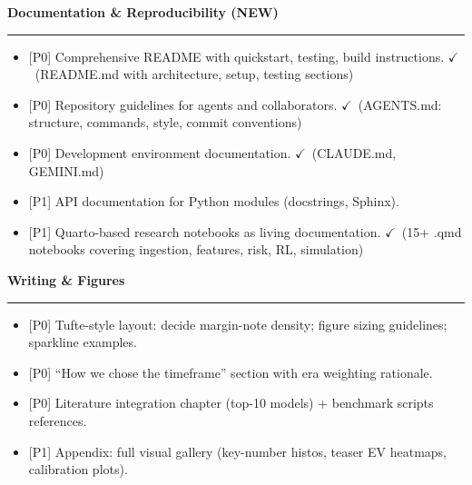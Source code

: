 \documentclass[11pt]{article}
\newcommand{\milestone}[1]{\vspace{0.5em}\noindent\textbf{\large #1}\par\vspace{0.25em}\hrule\vspace{0.5em}}
\newcommand{\done}{\textcolor{green!60!black}{\(\checkmark\)}}
\newcommand{\prio}[1]{\textcolor{blue!70!black}{[#1]}}
\begin{document}
\begin{itemize}
\milestone{Documentation \& Reproducibility (NEW)}
\begin{itemize}
  \item \prio{P0} Comprehensive README with quickstart, testing, build instructions. \done\ (README.md with architecture, setup, testing sections)
  \item \prio{P0} Repository guidelines for agents and collaborators. \done\ (AGENTS.md: structure, commands, style, commit conventions)
  \item \prio{P0} Development environment documentation. \done\ (CLAUDE.md, GEMINI.md)
  \item \prio{P1} API documentation for Python modules (docstrings, Sphinx).
  \item \prio{P1} Quarto-based research notebooks as living documentation. \done\ (15+ .qmd notebooks covering ingestion, features, risk, RL, simulation)
\end{itemize}

\milestone{Writing \& Figures}
\begin{itemize}
  \item \prio{P0} Tufte-style layout: decide margin-note density; figure sizing guidelines; sparkline examples.
  \item \prio{P0} “How we chose the timeframe” section with era weighting rationale.
  \item \prio{P0} Literature integration chapter (top-10 models) + benchmark scripts references.
  \item \prio{P1} Appendix: full visual gallery (key-number histos, teaser EV heatmaps, calibration plots).
\end{itemize}


\end{itemize}
\end{document}

